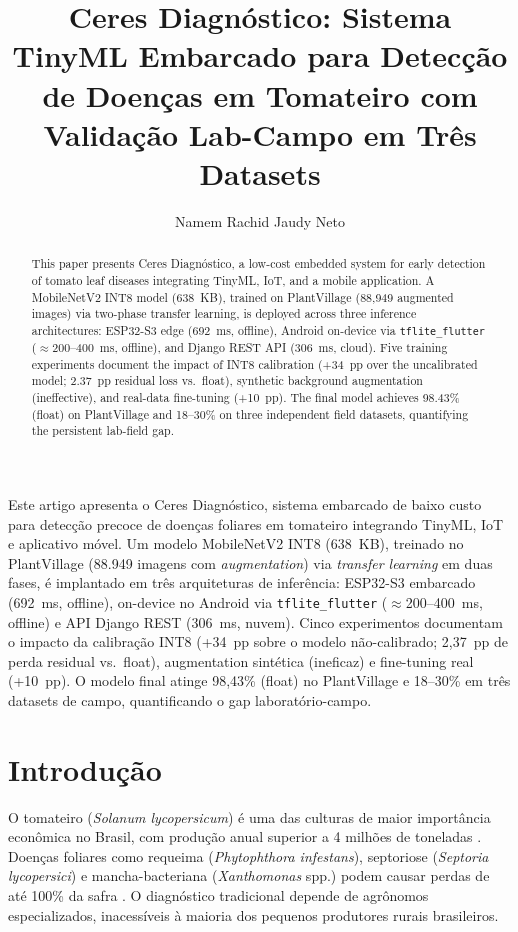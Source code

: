 \documentclass[12pt]{article}
\title{Ceres Diagnóstico: Sistema TinyML Embarcado para Detecção de
Doenças em Tomateiro com Validação Lab-Campo em Três Datasets}
\author{Namem Rachid Jaudy Neto\inst{1}}
\begin{document}
\maketitle

\begin{abstract}
This paper presents Ceres Diagnóstico, a low-cost embedded system for early
detection of tomato leaf diseases integrating TinyML, IoT, and a mobile application.
A MobileNetV2 INT8 model (638~KB), trained on PlantVillage (88{,}949 augmented
images) via two-phase transfer learning, is deployed across three inference
architectures:
ESP32-S3 edge (692~ms, offline), Android on-device via \texttt{tflite\_flutter}
($\approx$200--400~ms, offline), and Django REST API (306~ms, cloud). Five training
experiments document the impact of INT8 calibration (+34~pp over the uncalibrated
model; 2.37~pp residual loss vs.\ float), synthetic background augmentation
(ineffective), and real-data fine-tuning (+10~pp). The final model achieves 98.43\%
(float) on PlantVillage and 18--30\% on three independent field datasets,
quantifying the persistent lab-field gap.
\end{abstract}

\begin{resumo}
Este artigo apresenta o Ceres Diagnóstico, sistema embarcado de baixo custo para
detecção precoce de doenças foliares em tomateiro integrando TinyML, IoT e
aplicativo móvel. Um modelo MobileNetV2 INT8 (638~KB), treinado no PlantVillage
(88.949 imagens com \textit{augmentation}) via \textit{transfer learning} em duas
fases, é implantado em três arquiteturas de inferência: ESP32-S3 embarcado
(692~ms, offline), on-device no
Android via \texttt{tflite\_flutter} ($\approx$200--400~ms, offline) e API Django
REST (306~ms, nuvem). Cinco experimentos documentam o impacto da calibração INT8
(+34~pp sobre o modelo não-calibrado; 2,37~pp de perda residual vs.\ float),
augmentation sintética (ineficaz) e fine-tuning real (+10~pp). O modelo final atinge
98,43\% (float) no PlantVillage e 18--30\% em três datasets de campo,
quantificando o gap laboratório-campo.
\end{resumo}


\section{Introdução}

O tomateiro (\textit{Solanum lycopersicum}) é uma das culturas de maior importância
econômica no Brasil, com produção anual superior a 4 milhões de toneladas
\cite{fao2024}. Doenças foliares como requeima (\textit{Phytophthora infestans}),
septoriose (\textit{Septoria lycopersici}) e mancha-bacteriana (\textit{Xanthomonas}
spp.) podem causar perdas de até 100\% da safra \cite{embrapa2023}. O diagnóstico
tradicional depende de agrônomos especializados, inacessíveis à maioria dos pequenos
produtores rurais brasileiros.
\end{document}
